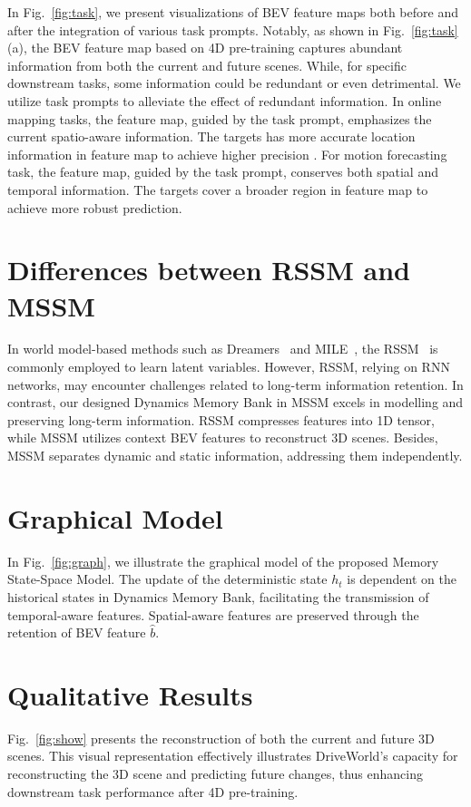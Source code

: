 In Fig.~\ref{fig:task}, we present visualizations of BEV feature maps both before and after the integration of various task prompts. 
Notably, as shown in Fig.~\ref{fig:task} (a), the BEV feature map based on 4D pre-training captures abundant information from both the current and future scenes. While, for specific downstream tasks, some information could be redundant or even detrimental. We utilize task prompts to alleviate the effect of redundant information.
In online mapping tasks, the feature map, guided by the task prompt, emphasizes the current spatio-aware information. The targets has more accurate location information in feature map to achieve higher precision .
For motion forecasting task, the feature map, guided by the task prompt, conserves both spatial and temporal information. The targets cover a broader region in feature map to achieve more robust prediction.

\section{Differences between RSSM and MSSM}
In world model-based methods such as Dreamers~\cite{dreamerv1, dreamerv2, dreamerv3} and MILE~\cite{mile}, the RSSM~\cite{latent} is commonly employed to learn latent variables. However, RSSM, relying on RNN networks, may encounter challenges related to long-term information retention. In contrast, our designed Dynamics Memory Bank in MSSM excels in modelling and preserving long-term information. RSSM compresses features into 1D tensor, while MSSM utilizes context BEV features to reconstruct 3D scenes. Besides, MSSM separates dynamic and static information, addressing them independently.

\section{Graphical Model}

In Fig.~\ref{fig:graph}, we illustrate the graphical model of the proposed Memory State-Space Model. The update of the deterministic state $h_t$ is dependent on the historical states in Dynamics Memory Bank, facilitating the transmission of temporal-aware features. Spatial-aware features are preserved through the retention of BEV feature $\hat{b}$. 

\section{Qualitative Results}

Fig.~\ref{fig:show} presents the reconstruction of both the current and future 3D scenes. This visual representation effectively illustrates DriveWorld's capacity for reconstructing the 3D scene and predicting future changes, thus enhancing downstream task performance after 4D pre-training.